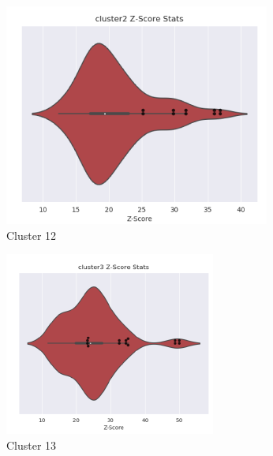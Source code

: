 \begin{figure}[htb]
\begin{subfigure}{0.2\textwidth}
  \includegraphics[width=\linewidth]{Pfam/cl12.png}
  \caption{Cluster 12}
  \label{fig:cl12}
\end{subfigure}\hfil %
\begin{subfigure}{0.2\textwidth}
  \includegraphics[width=\linewidth]{Pfam/cl13.png}
  \caption{Cluster 13}
  \label{fig:cl13}
\end{subfigure}\hfil %
\begin{subfigure}{0.2\textwidth}

\end{subfigure}
\end{figure}
